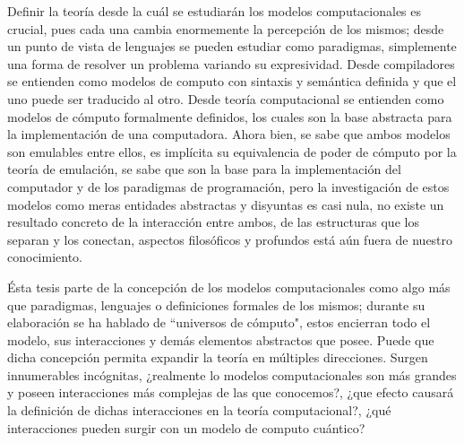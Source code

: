 \begin{conclusiones}
	Definir la teoría desde la cuál se estudiarán los modelos computacionales es crucial, pues cada una cambia enormemente la percepción de los mismos; desde un punto de vista de lenguajes se pueden estudiar como paradigmas, simplemente una forma de resolver un problema variando su expresividad. Desde compiladores se entienden como modelos de computo con sintaxis y semántica definida y que el uno puede ser traducido al otro. Desde teoría computacional se entienden como modelos de cómputo formalmente definidos, los cuales son la base abstracta para la implementación de una computadora. Ahora bien, se sabe que ambos modelos son emulables entre ellos, es implícita su equivalencia de poder de cómputo por la teoría de emulación, se sabe que son la base para la implementación del computador y de los paradigmas de programación, pero la investigación de estos modelos como meras entidades abstractas y disyuntas es casi nula, no existe un resultado concreto de la interacción entre ambos, de las estructuras que los separan y los conectan, aspectos filosóficos y profundos está aún fuera de nuestro conocimiento.
		
	Ésta tesis parte de la concepción de los modelos computacionales como algo más que paradigmas, lenguajes o definiciones formales de los mismos; durante su elaboración se ha hablado de ``universos de cómputo", estos encierran todo el modelo, sus interacciones y demás elementos abstractos que posee. Puede que dicha concepción permita expandir la teoría en múltiples direcciones. Surgen innumerables incógnitas, ¿realmente lo modelos computacionales son más grandes y poseen interacciones más complejas de las que conocemos?, ¿que efecto causará la definición de dichas interacciones en la teoría computacional?, ¿qué interacciones pueden surgir con un modelo de computo cuántico?
\end{conclusiones}
